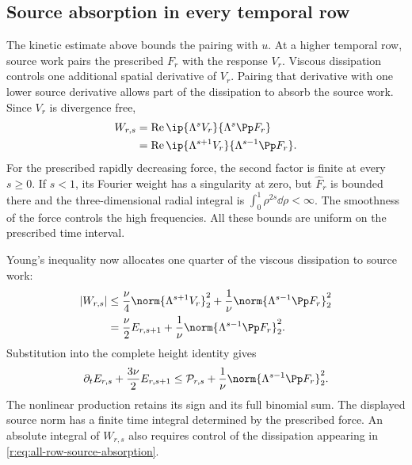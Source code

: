 \subsection{Source absorption in every temporal row}
\label{r:sec:all-row-source-absorption}

The kinetic estimate above bounds the pairing with \(u\). At a higher
temporal row, source work pairs the prescribed \(F_r\) with the response
\(V_r\). Viscous dissipation controls one additional spatial derivative
of \(V_r\). Pairing that derivative with one lower source derivative
allows part of the dissipation to absorb the source work.
Since \(V_r\) is divergence free,
\begin{equation}
 \begin{aligned}
 W_{r,s}
 &=\operatorname{Re}\ip{\Lambda^sV_r}{\Lambda^s\Pp F_r}\\
 &=\operatorname{Re}\ip{\Lambda^{s+1}V_r}
                         {\Lambda^{s-1}\Pp F_r}.
 \end{aligned}
 \label{r:eq:all-row-source-duality}
\end{equation}
For the prescribed rapidly decreasing force, the second factor is finite
at every \(s\ge0\). If \(s<1\), its Fourier weight has a singularity
at zero, but \(\widehat F_r\) is bounded there and the three-dimensional
radial integral is \(\int_0^1\rho^{2s}\dd\rho<\infty\).
The smoothness of the force controls the high frequencies. All these
bounds are uniform on the prescribed time interval.

Young's inequality now allocates one quarter of the viscous dissipation
to source work:
\begin{equation}
 \begin{aligned}
 |W_{r,s}|
 &\le\frac\nu4\norm{\Lambda^{s+1}V_r}_2^2
       +\frac1\nu\norm{\Lambda^{s-1}\Pp F_r}_2^2\\
 &=\frac\nu2E_{r,s+1}
       +\frac1\nu\norm{\Lambda^{s-1}\Pp F_r}_2^2.
 \end{aligned}
 \label{r:eq:all-row-source-absorption}
\end{equation}
Substitution into the complete height identity gives
\begin{equation}
 \partial_tE_{r,s}+\frac{3\nu}{2}E_{r,s+1}
 \le\mathcal P_{r,s}
       +\frac1\nu\norm{\Lambda^{s-1}\Pp F_r}_2^2.
 \label{r:eq:all-row-source-retained-production}
\end{equation}
The nonlinear production retains its sign and its full binomial sum.
The displayed source norm has a finite time integral determined by the
prescribed force. An absolute integral of \(W_{r,s}\) also requires
control of the dissipation appearing in
\eqref{r:eq:all-row-source-absorption}.

